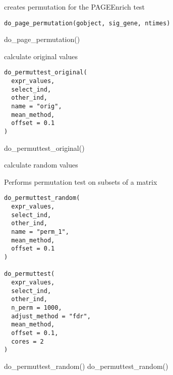 \documentclass[a4paper]{book}
\begin{document}
%
\begin{Description}\relax
creates permutation for the PAGEEnrich test
\end{Description}
%
\begin{Usage}
\begin{verbatim}
do_page_permutation(gobject, sig_gene, ntimes)
\end{verbatim}
\end{Usage}
%
\begin{Examples}
\begin{ExampleCode}
    do_page_permutation()
\end{ExampleCode}
\end{Examples}
%
\begin{Description}\relax
calculate original values
\end{Description}
%
\begin{Usage}
\begin{verbatim}
do_permuttest_original(
  expr_values,
  select_ind,
  other_ind,
  name = "orig",
  mean_method,
  offset = 0.1
)
\end{verbatim}
\end{Usage}
%
\begin{Examples}
\begin{ExampleCode}
    do_permuttest_original()
\end{ExampleCode}
\end{Examples}
%
\begin{Description}\relax
calculate random values

Performs permutation test on subsets of a matrix
\end{Description}
%
\begin{Usage}
\begin{verbatim}
do_permuttest_random(
  expr_values,
  select_ind,
  other_ind,
  name = "perm_1",
  mean_method,
  offset = 0.1
)

do_permuttest(
  expr_values,
  select_ind,
  other_ind,
  n_perm = 1000,
  adjust_method = "fdr",
  mean_method,
  offset = 0.1,
  cores = 2
)
\end{verbatim}
\end{Usage}
%
\begin{Examples}
\begin{ExampleCode}
    do_permuttest_random()
    do_permuttest_random()
\end{ExampleCode}
\end{Examples}
\end{document}
